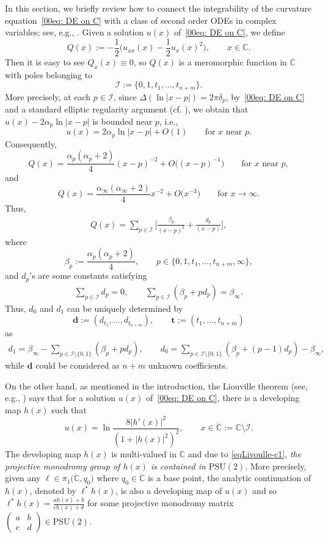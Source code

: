 \documentclass[11pt]{article}
\numberwithin{equation}{section}
\numberwithin{equation}{section}
\def\C{\mathbb C}
\def\PSU{\mathrm{PSU}}
\def\SM#1#2#3#4{\left(\begin{smallmatrix}#1&#2\\#3&#4\end{smallmatrix}
 \right)}
\def\bt{\boldsymbol t}
\begin{document}
In this section, we briefly review how to connect the integrability of the curvature equation~\eqref{00eq: DE on C} with a class of second order ODEs in complex variables; see, e.g., \cite{Chai-Lin-Wang,Coaxial}. Given a solution $u(x)$ of~\eqref{00eq: DE on C}, we define
\begin{equation*}%
 Q(x):=-\frac12\biggl(u_{xx}(x)-\frac12 u_x(x)^2\biggr),\qquad
 x\in\mathbb{C}.
\end{equation*}
Then it is easy to see $Q_{\bar{x}}(x)\equiv 0$, so $Q(x)$ is a meromorphic function in $\mathbb{C}$ with poles belonging to
\[
 \mathcal{I}:=\{0,1,t_1,\dots,t_{n+m}\}.
\]
More precisely, at each $p\in\mathcal{I}$, since $\Delta (\ln|x-p|)=2\pi\delta_p$, by~\eqref{00eq: DE on C} and a standard elliptic regularity argument (cf. \cite{BM}), we obtain that $u(x)-2\alpha_p\ln|x-p|$ is bounded near $p$, i.e.,
\[u(x)=2\alpha_p\ln|x-p|+O(1)\qquad\text{for $x$ near $p$}.\]
Consequently,
\[Q(x)=\frac{\alpha_p(\alpha_p+2)}{4}(x-p)^{-2}+O\bigl((x-p)^{-1}\bigr)\qquad\text{for $x$ near $p$},\]
and
\[Q(x)=\frac{\alpha_\infty(\alpha_\infty+2)}{4}x^{-2}+O\bigl(x^{-3}\bigr)\qquad\text{for $x\to \infty$}.\]
Thus,
\begin{align}\label{e0q-30}
Q(x)=\sum_{p\in\mathcal{I}}\biggl[\frac{\beta_p}{(x-p)^2}+\frac{d_p}{(x-p)}\biggr],
\end{align}
where
\begin{equation}\label{e0q-31}
 \beta_p:=\frac{\alpha_{p}(\alpha_{p}+2)}{4},\qquad p\in \{0,1,t_1,\dots, t_{n+m},\infty\},
\end{equation}
and $d_p$'s are some constants satisfying
\begin{align}\label{e0q-32}
\sum_{p\in \mathcal{I}}d_p=0,\qquad \sum_{p\in \mathcal{I}}(\beta_p+pd_p)=\beta_\infty.
\end{align}
Thus, $d_0$ and $d_1$ can be uniquely determined by
\[
 \boldsymbol d:=(d_{t_1},\dots, d_{t_{n+m}}),\qquad
 \bt:=(t_1,\dots,t_{n+m})
\]
as
\begin{align*}%
d_1=\beta_\infty-\sum_{p\in\mathcal{I}\setminus\{0,1\}}(\beta_p+pd_p),
 \qquad d_0=\sum_{p\in \mathcal{I}\setminus\{0,1\}}
 (\beta_p+(p-1)d_p)-\beta_\infty,
\end{align*}
 while $\boldsymbol d$ could be considered as $n+m$ unknown coefficients.

On the other hand, as mentioned in the introduction, the Liouville
theorem (see, e.g., \cite{Chai-Lin-Wang}) says that for a solution
$u(x)$ of~\eqref{00eq: DE on C}, there is a developing map $h(x)$ such
that
\begin{equation}\label{eqLivoulle-c1}
u(x)=\ln\frac{8|h'(x)|^2}{(1+|h(x)|^2)^2},\qquad x\in \dot{\C}:=\mathbb{C}\setminus\mathcal{I}.
\end{equation}
The developing map $h(x)$ is multi-valued in $\mathbb{C}$ and due to
\eqref{eqLivoulle-c1}, \emph{the projective monodromy group of $h(x)$
 is contained in $\PSU(2)$}. More precisely, given any $\ell\in
\pi_1\bigl(\dot{\C}, q_0\bigr)$ where $q_0\in\dot{\C}$ is a base point, the
analytic continuation of $h(x)$, denoted by $\ell^*h(x)$, is also a
developing map of $u(x)$ and so $\ell^*h(x)=\frac{ah(x)+b}{ch(x)+d}$
for some projective monodromy matrix $\SM{a}{b}{c}{d}\in\PSU(2)$.
\end{document}
